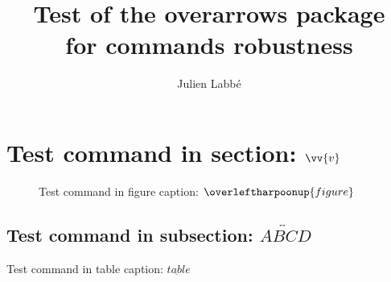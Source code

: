 \documentclass{article}
\title{Test of the \textsf{overarrows} package\\for commands robustness}
\author{Julien Labb\'e}
\begin{document}
\maketitle

\tableofcontents

\listoftables

\listoffigures

\section{Test command in section: $\vv{v}$}

\begin{figure}
  \caption{Test command in figure caption: $\overleftharpoonup{figure}$}
\end{figure}

\subsection{Test command in subsection: $\overleftrightarrow{ABCD}$}

\begin{table}
  \caption{Test command in table caption: $\underbar{table}$}
\end{table}
\end{document}
